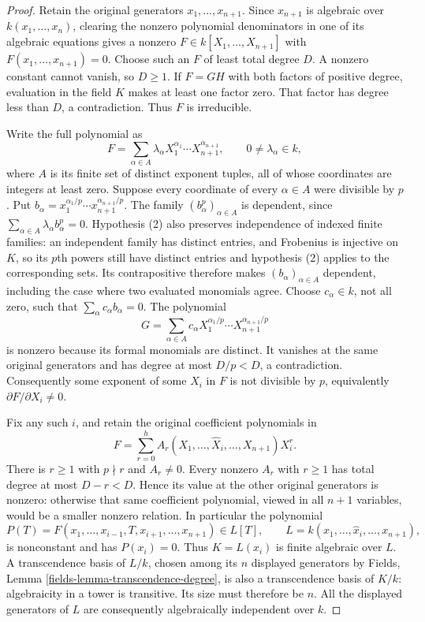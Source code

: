 \begin{proof}
Retain the original generators $x_1,\ldots,x_{n+1}$.
Since $x_{n+1}$ is algebraic over $k(x_1,\ldots,x_n)$,
clearing the nonzero polynomial denominators in one of its
algebraic equations gives a nonzero
$F\in k[X_1,\ldots,X_{n+1}]$ with $F(x_1,\ldots,x_{n+1})=0$.
Choose such an $F$ of least total degree $D$. A nonzero
constant cannot vanish, so $D\geq1$. If $F=GH$ with both
factors of positive degree, evaluation in the field $K$
makes at least one factor zero. That factor has degree
less than $D$, a contradiction. Thus $F$ is irreducible.

Write the full polynomial as
$$
F=\sum_{\alpha\in A}\lambda_\alpha
X_1^{\alpha_1}\cdots X_{n+1}^{\alpha_{n+1}},
\qquad 0\neq\lambda_\alpha\in k,
$$
where $A$ is its finite set of distinct exponent tuples,
all of whose coordinates are integers at least zero.
Suppose every coordinate of every $\alpha\in A$ were
divisible by $p$. Put
$b_\alpha=x_1^{\alpha_1/p}\cdots x_{n+1}^{\alpha_{n+1}/p}$.
The family $(b_\alpha^p)_{\alpha\in A}$ is dependent,
since $\sum_{\alpha\in A}\lambda_\alpha b_\alpha^p=0$.
Hypothesis (2) also preserves independence of indexed
finite families: an independent family has distinct
entries, and Frobenius is injective on $K$, so its
$p$th powers still have distinct entries and hypothesis
(2) applies to the corresponding sets. Its contrapositive
therefore makes $(b_\alpha)_{\alpha\in A}$ dependent,
including the case where two evaluated monomials agree.
Choose $c_\alpha\in k$, not all zero, such that
$\sum_\alpha c_\alpha b_\alpha=0$. The polynomial
$$
G=\sum_{\alpha\in A}c_\alpha
X_1^{\alpha_1/p}\cdots X_{n+1}^{\alpha_{n+1}/p}
$$
is nonzero because its formal monomials are distinct.
It vanishes at the same original generators and has
degree at most $D/p<D$, a contradiction. Consequently
some exponent of some $X_i$ in $F$ is not divisible
by $p$, equivalently $\partial F/\partial X_i\neq0$.

Fix any such $i$, and retain the original coefficient
polynomials in
$$
F=\sum_{r=0}^h A_r(X_1,\ldots,\widehat X_i,\ldots,X_{n+1})X_i^r.
$$
There is $r\geq1$ with $p\nmid r$ and $A_r\neq0$.
Every nonzero $A_r$ with $r\geq1$ has total degree
at most $D-r<D$. Hence its value at the other original
generators is nonzero: otherwise that same coefficient
polynomial, viewed in all $n+1$ variables, would be a
smaller nonzero relation. In particular the polynomial
$$
P(T)=F(x_1,\ldots,x_{i-1},T,x_{i+1},\ldots,x_{n+1})
\in L[T],\qquad
L=k(x_1,\ldots,\widehat x_i,\ldots,x_{n+1}),
$$
is nonconstant and has $P(x_i)=0$. Thus $K=L(x_i)$
is finite algebraic over $L$. A transcendence basis of
$L/k$, chosen among its $n$ displayed generators by
Fields, Lemma \ref{fields-lemma-transcendence-degree},
is also a transcendence basis of $K/k$: algebraicity
in a tower is transitive. Its size must therefore be
$n$. All the displayed generators of $L$ are consequently
algebraically independent over $k$.


\end{proof}
